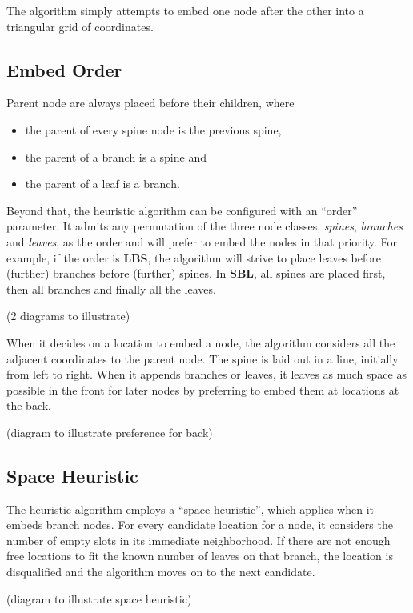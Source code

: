 \documentclass[draft,final]{vutinfth} %
\begin{document}
The algorithm simply attempts to embed one node after the other into a triangular grid of coordinates.

\subsection{Embed Order}

Parent node are always placed before their children, where

\begin{itemize}
    \item the parent of every spine node is the previous spine,
    \item the parent of a branch is a spine and
    \item the parent of a leaf is a branch.
\end{itemize}

Beyond that, the heuristic algorithm can be configured with an ``order'' parameter.
It admits any permutation of the three node classes, \emph{spines}, \emph{branches} and \emph{leaves}, as the order and will prefer to embed the nodes in that priority.
For example, if the order is \textbf{LBS}, the algorithm will strive to place leaves before (further) branches before (further) spines. In \textbf{SBL}, all spines are placed first, then all branches and finally all the leaves.

(2 diagrams to illustrate)

When it decides on a location to embed a node, the algorithm considers all the adjacent coordinates to the parent node.
The spine is laid out in a line, initially from left to right.
When it appends branches or leaves, it leaves as much space as possible in the front for later nodes by preferring to embed them at locations at the back.

(diagram to illustrate preference for back)

\subsection{Space Heuristic}

The heuristic algorithm employs a ``space heuristic'', which applies when it embeds branch nodes.
For every candidate location for a node, it considers the number of empty slots in its immediate neighborhood. If there are not enough free locations to fit the known number of leaves on that branch, the location is disqualified and the algorithm moves on to the next candidate.

(diagram to illustrate space heuristic)
\end{document}
